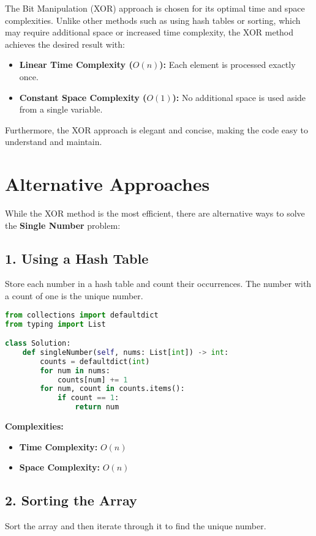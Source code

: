 The Bit Manipulation (XOR) approach is chosen for its optimal time and space complexities. Unlike other methods such as using hash tables or sorting, which may require additional space or increased time complexity, the XOR method achieves the desired result with:

\begin{itemize}
    \item \textbf{Linear Time Complexity (\(O(n)\)):} Each element is processed exactly once.
    \item \textbf{Constant Space Complexity (\(O(1)\)):} No additional space is used aside from a single variable.
\end{itemize}

Furthermore, the XOR approach is elegant and concise, making the code easy to understand and maintain.

\section*{Alternative Approaches}

While the XOR method is the most efficient, there are alternative ways to solve the \textbf{Single Number} problem:

\subsection*{1. Using a Hash Table}
Store each number in a hash table and count their occurrences. The number with a count of one is the unique number.

\begin{lstlisting}[language=Python]
from collections import defaultdict
from typing import List

class Solution:
    def singleNumber(self, nums: List[int]) -> int:
        counts = defaultdict(int)
        for num in nums:
            counts[num] += 1
        for num, count in counts.items():
            if count == 1:
                return num
\end{lstlisting}

\textbf{Complexities:}
\begin{itemize}
    \item \textbf{Time Complexity:} \(O(n)\)
    \item \textbf{Space Complexity:} \(O(n)\)
\end{itemize}

\subsection*{2. Sorting the Array}
Sort the array and then iterate through it to find the unique number.

